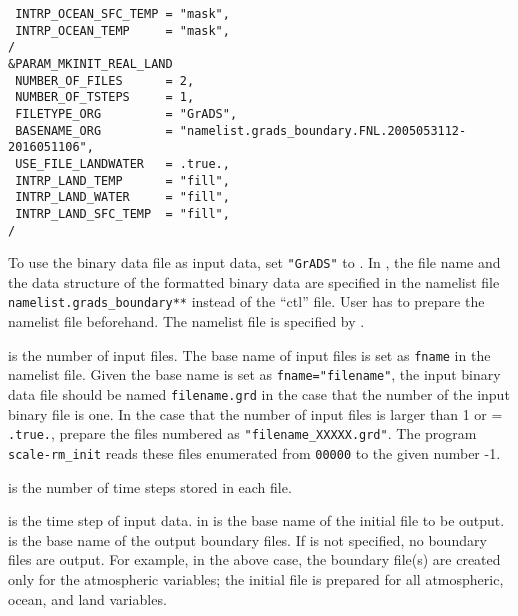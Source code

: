 {\verb| INTRP_OCEAN_SFC_TEMP = "mask",|\\
\verb| INTRP_OCEAN_TEMP     = "mask",|\\
\verb|/|\\
\verb|&PARAM_MKINIT_REAL_LAND|\\
\verb| NUMBER_OF_FILES      = 2,|\\
\verb| NUMBER_OF_TSTEPS     = 1, |\\
\verb| FILETYPE_ORG         = "GrADS",|\\
\verb| BASENAME_ORG         = "namelist.grads_boundary.FNL.2005053112-2016051106",|\\
\verb| USE_FILE_LANDWATER   = .true.,|\\
\verb| INTRP_LAND_TEMP      = "fill",|\\
\verb| INTRP_LAND_WATER     = "fill",|\\
\verb| INTRP_LAND_SFC_TEMP  = "fill",|\\
\verb|/|\\
}

To use the binary data file as input data, set \verb|"GrADS"| to .
In \scalerm, the file name and the data structure of the \grads formatted binary data are specified in the namelist file \verb|namelist.grads_boundary**| instead of the ``ctl'' file.
User has to prepare the namelist file beforehand.
The namelist file is specified by .

 is the number of input files.
The base name of input files is set as \verb|fname| in the namelist file.
Given the base name is set as \verb|fname="filename"|, the input binary data file should be named  \verb|filename.grd| in the case that the number of the input binary file is one.
In the case that the number of input files is larger than 1 or  = \verb|.true.|, prepare the files numbered as \verb|"filename_XXXXX.grd"|.
The program \verb|scale-rm_init| reads these files enumerated from \verb|00000| to the given number -1.

 is the number of time steps stored in each file.


 is the time step of input data.
 in  is the base name of the initial file to be output.
 is the base name of the output boundary files.
If  is not specified, no boundary files are output.
For example, in the above case, the boundary file(s) are created only for the atmospheric variables; the initial file is prepared for all atmospheric, ocean, and land variables.

